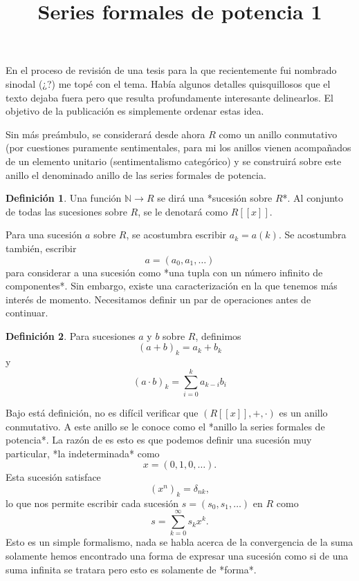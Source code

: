 \documentclass[letter,10pt,notitlepage]{article}
\title{Series formales de potencia 1}
\date{}
\theoremstyle{definition}
\newtheorem{definition}{Definición}
\theoremstyle{remark}
\begin{document}
\maketitle

En el proceso de revisión de una tesis para la que recientemente fui nombrado sinodal (¿?) me topé con el tema. Había algunos
detalles quisquillosos que el texto dejaba fuera pero que resulta profundamente interesante delinearlos. El objetivo
de la publicación es simplemente ordenar estas idea.

Sin más preámbulo, se considerará desde ahora \( R\) como un anillo conmutativo (por cuestiones puramente sentimentales, para mi los anillos
vienen acompañados de un elemento unitario (sentimentalismo categórico) y se construirá sobre este anillo el denominado
anillo de las series formales de potencia.

\begin{definition}
  Una función \( \mathbb{N} \to R \) se dirá una *sucesión sobre \( R\)*. Al conjunto de todas las sucesiones sobre \(R\),
  se le denotará como \( R[[x]]\).
\end{definition}

Para una sucesión \(a\) sobre \(R\), se acostumbra escribir \(a_k = a(k)\). Se acostumbra también, escribir
\[ a = (a_0,a_1, \dots )\]
para considerar a una sucesión como *una tupla con un número infinito de componentes*. Sin embargo, existe una caracterización en
la que tenemos más interés de momento. Necesitamos definir un par de operaciones antes de continuar.

\begin{definition}
  Para sucesiones \(a\) y \(b\) sobre \(R\), definimos
  \[ (a + b)_k = a_k + b_k \]
  y
  \[ (a \cdot b)_k = \sum_{i=0}^ka_{k-i}b_{i}\]
\end{definition}

Bajo está definición, no es difícil verificar que \( (R[[x]],+,\cdot) \) es un anillo conmutativo. 
A este anillo se le conoce como el *anillo la series formales de potencia*. La razón de es esto es que podemos definir
una sucesión muy particular, *la indeterminada* como
\[ x = (0,1,0,\ldots).\]
Esta sucesión satisface
\[ (x^n)_k = \delta_{nk},\]
lo que nos permite escribir cada sucesión \( s = (s_0, s_1, \ldots)\) en \( R\) como
\[ s = \sum_{k=0}^{\infty}s_kx^k.\]
Esto es un simple formalismo, nada se habla acerca de la convergencia de la suma solamente hemos encontrado una
forma de expresar una sucesión como si de una suma infinita se tratara pero esto es solamente de *forma*.
\end{document}
